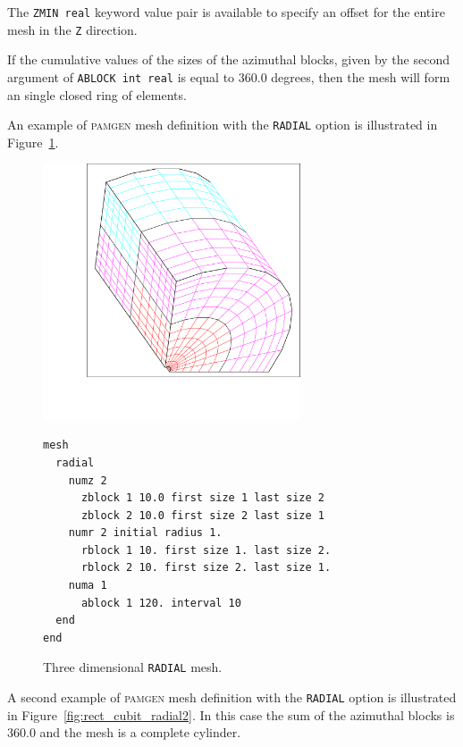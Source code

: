 The \texttt{ZMIN real} keyword value pair is available to specify an offset for the
entire mesh in the \texttt{Z} direction.

If the cumulative values of the sizes of the azimuthal blocks, given
by the second argument of \texttt{ABLOCK int real} is equal to 360.0 degrees, then the mesh
will form an single closed ring of elements.


An example of \textsc{pamgen} mesh definition with the
\texttt{RADIAL} option is illustrated in
Figure~\ref{fig:rect_cubit_radial}.

\begin{figure}[!thbp]
\centering
\hfil
  \begin{minipage}[c]{1.0\linewidth}
    \centering
\includegraphics[width=3.0in]{cubit_radial1}
{\ttfamily \begin{verbatim}
mesh
  radial
    numz 2
      zblock 1 10.0 first size 1 last size 2
      zblock 2 10.0 first size 2 last size 1
    numr 2 initial radius 1.
      rblock 1 10. first size 1. last size 2.
      rblock 2 10. first size 2. last size 1.
    numa 1
      ablock 1 120. interval 10
  end
end
\end{verbatim}}
  \end{minipage}%
  \caption{Three dimensional \texttt{RADIAL} mesh.}
  \label{fig:rect_cubit_radial}
\end{figure}



A second example of \textsc{pamgen} mesh definition with the
\texttt{RADIAL} option is illustrated in
Figure~\ref{fig:rect_cubit_radial2}. In this case the sum of the
azimuthal blocks is 360.0 and the mesh is a
complete cylinder.

